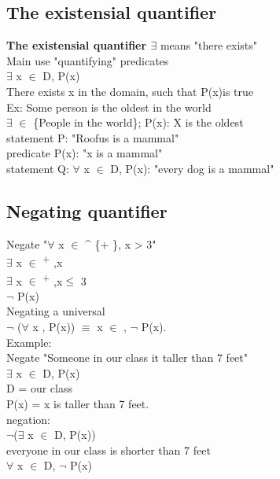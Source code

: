 \documentclass[11pt]{article}
\begin{document}
\subsection{The existensial quantifier}
\label{sec:org73d613c}
\textbf{The existensial quantifier \(\exists\)} means "there exists"\\

Main use "quantifying" predicates\\
\(\exists\) x \(\in\) D, P(x)\\
There exists x in the domain, such that P(x)is true\\

Ex: Some person is the oldest in the world\\
\(\exists\) \(\in\) \{People in the world\}; P(x): X is the oldest\\

statement P: "Roofus is a mammal"\\
predicate P(x): "x is a mammal"\\
statement Q: \(\forall\) x \(\in\) D, P(x): "every dog is a mammal"\\

\subsection{Negating quantifier}
\label{sec:orgd8ea9eb}
Negate "\(\forall\) x \(\in\) \^{} \{+ \}, x > 3"\\
\(\exists\) x \(\in\) \textsuperscript{+ },x \\
\(\exists\) x \(\in\) \textsuperscript{+ },x\(\le\) 3\\
\(\neg{}\) P(x)\\

Negating a universal\\
\(\neg{}\) (\(\forall\) x , P(x)) \(\equiv\) x \(\in\) , \(\neg{}\) P(x).\\

Example:\\
Negate "Someone in our class it taller than 7 feet"\\
\(\exists\) x \(\in\) D, P(x)\\
D = our class\\
P(x) = x is taller than 7 feet.\\

negation:\\
\(\neg{}\)(\(\exists\) x \(\in\) D, P(x))\\
everyone in our class is shorter than 7 feet\\
\(\forall\) x \(\in\) D, \(\neg{}\) P(x)\\
\end{document}
